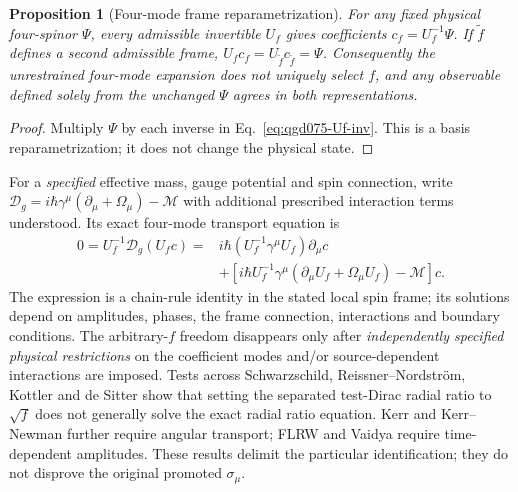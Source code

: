 \documentclass[11pt,a4paper]{article}
\newtheorem{proposition}{Proposition}[section]
\begin{document}
\begin{proposition}[Four-mode frame reparametrization]
\label{prop:qgd075-nonunique-profile}
For any fixed physical four-spinor $\Psi$, every admissible invertible
$U_f$ gives coefficients $c_f=U_f^{-1}\Psi$.  If $\tilde f$ defines a
second admissible frame, $U_fc_f=U_{\tilde f}c_{\tilde f}=\Psi$.
Consequently the unrestrained four-mode expansion does not uniquely select
$f$, and any observable defined solely from the unchanged $\Psi$ agrees
in both representations.
\end{proposition}
\begin{proof}
Multiply $\Psi$ by each inverse in Eq.~\eqref{eq:qgd075-Uf-inv}.
This is a basis reparametrization; it does not change the physical state.
\end{proof}

For a \emph{specified} effective mass, gauge potential and spin connection,
write $\mathcal D_g=i\hbar\gamma^\mu(\partial_\mu+\Omega_\mu)-\mathcal M$
with additional prescribed interaction terms understood. Its exact
four-mode transport equation is
\begin{equation}\label{eq:qgd075-fourmode-transport}
 \boxed{\begin{aligned}
 0=U_f^{-1}\mathcal D_g(U_fc)
 ={}&i\hbar(U_f^{-1}\gamma^\mu U_f)\partial_\mu c\\
 &+\left[i\hbar U_f^{-1}\gamma^\mu
 (\partial_\mu U_f+\Omega_\mu U_f)-\mathcal M\right]c.
 \end{aligned}}
\end{equation}
The expression is a chain-rule identity in the stated local spin frame;
its solutions depend on amplitudes, phases, the frame connection,
interactions and boundary conditions. The arbitrary-$f$ freedom disappears
only after \emph{independently specified physical restrictions} on the
coefficient modes and/or source-dependent interactions are imposed.
Tests across Schwarzschild, Reissner--Nordstr\"om, Kottler and de Sitter
show that setting the separated test-Dirac radial ratio to $\sqrt f$
does not generally solve the exact radial ratio equation. Kerr and
Kerr--Newman further require angular transport; FLRW and Vaidya require
time-dependent amplitudes. These results delimit the particular
identification; they do not disprove the original promoted $\sigma_\mu$.
\end{document}
